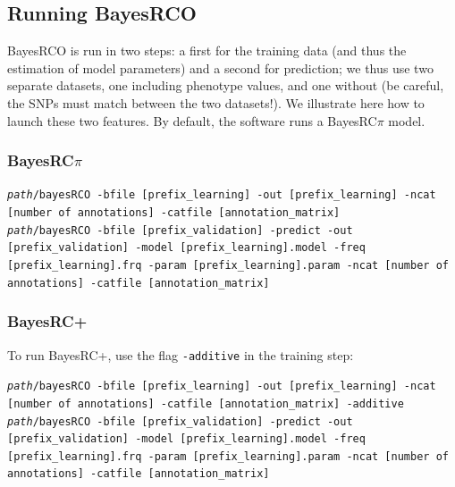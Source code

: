 \documentclass{ol-softwaremanual}
\begin{document}
\color{black}

\subsection{Running BayesRCO}

BayesRCO is run in two steps: a first for the training data (and thus the estimation of model parameters) and a second for prediction; we thus use two separate datasets, one including phenotype values, and one without (be careful, the SNPs must match between the two datasets!). We illustrate here how to launch these two features. By default, the software runs a BayesRC$\pi$ model.

\subsubsection{BayesRC$\pi$}

\begin{tcolorbox}

\texttt{\textit{path}/bayesRCO -bfile [prefix\_learning] -out [prefix\_learning] -ncat [number of annotations] -catfile [annotation\_matrix]} \\

\texttt{\textit{path}/bayesRCO -bfile [prefix\_validation] -predict -out [prefix\_validation] -model [prefix\_learning].model -freq [prefix\_learning].frq -param [prefix\_learning].param -ncat [number of annotations] -catfile [annotation\_matrix] }
\end{tcolorbox}

\subsubsection{BayesRC+}

To run BayesRC+, use the flag \texttt{-additive} in the training step:

\begin{tcolorbox}

\texttt{\textit{path}/bayesRCO -bfile [prefix\_learning] -out [prefix\_learning] -ncat [number of annotations] -catfile [annotation\_matrix] -additive} \\

\texttt{\textit{path}/bayesRCO -bfile [prefix\_validation] -predict -out [prefix\_validation] -model [prefix\_learning].model -freq [prefix\_learning].frq -param [prefix\_learning].param -ncat [number of annotations] -catfile [annotation\_matrix] }
\end{tcolorbox}
\end{document}
